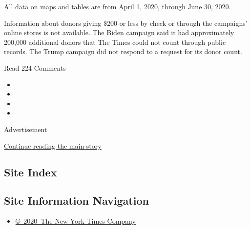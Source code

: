All data on maps and tables are from April 1, 2020, through June 30,
2020.

Information about donors giving \$200 or less by check or through the
campaigns' online stores is not available. The Biden campaign said it
had approximately 200,000 additional donors that The Times could not
count through public records. The Trump campaign did not respond to a
request for its donor count.

Read 224 Comments

\begin{itemize}
\item
\item
\item
\item
\end{itemize}

Advertisement

\protect\hyperlink{after-bottom}{Continue reading the main story}

\hypertarget{site-index}{%
\subsection{Site Index}\label{site-index}}

\hypertarget{site-information-navigation}{%
\subsection{Site Information
Navigation}\label{site-information-navigation}}

\begin{itemize}
\tightlist
\item
  \href{https://help.nytimes.com/hc/en-us/articles/115014792127-Copyright-notice}{©~2020~The
  New York Times Company}
\end{itemize}


